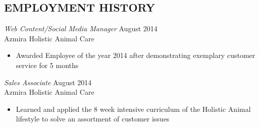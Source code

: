 \documentclass[margin]{res}
\begin{document}
\begin{resume}
\section{EMPLOYMENT HISTORY} 

  {\sl Web Content/Social Media Manager} \hfill August 2014 \\
  Azmira Holistic Animal Care
  \begin{itemize}
      \item Awarded Employee of the year 2014 after demonstrating exemplary customer service for 5 months
  \end{itemize}

  {\sl Sales Associate} \hfill August 2014 \\
  Azmira Holistic Animal Care
  \begin{itemize}
      \item Learned and applied the 8 week intensive curriculum of the Holistic Animal lifestyle to solve an assortment of customer issues
  \end{itemize} 



\end{resume}
\end{document}
